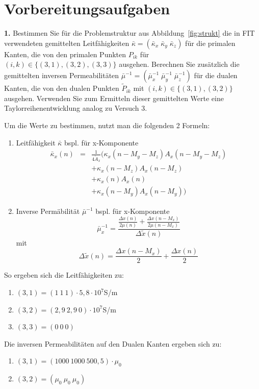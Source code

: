 \documentclass[Protokollheft.tex]{subfiles}
\begin{document}
\section{Vorbereitungsaufgaben}

\begin{framed}
	\noindent \textbf{1.} Bestimmen Sie für die Problemstruktur aus Abbildung~\ref{fig:strukt} die in FIT verwendeten
    gemittelten Leitfähigkeiten $\bar{\kappa}=(\bar{\kappa}_x\;\bar{\kappa}_y\;\bar{\kappa}_z)$ für die primalen Kanten, die von den primalen Punkten $P_{ik}$ für $(i,k)\in\{(3,1),(3,2),(3,3)\}$ ausgehen. Berechnen Sie zusätzlich die gemittelten inversen Permeabilitäten $\bar{\mu}^{-1}=(\bar{\mu}_x^{-1}\;\bar{\mu}_y^{-1}\;\bar{\mu}_z^{-1})$ für die dualen Kanten, die von den dualen Punkten $\widetilde{P}_{ik}$ mit $(i,k)\in\{(3,1),(3,2)\}$ ausgehen. Verwenden Sie zum Ermitteln dieser gemittelten Werte eine Taylorreihenentwicklung analog zu Versuch 3.\label{exer:averagedMaterials}
\end{framed}

Um die Werte zu bestimmen, nutzt man die folgenden 2 Formeln:
\begin{enumerate}
	\item Leitfähigkeit $\bar{\kappa}$
     bspl. für x-Komponente
     \begin{eqnarray*} \bar{\kappa}_x(n)& = &\frac{1}{4\tilde{A}_x}(\kappa_x(n-M_y-M_z)A_x(n-M_y-M_z)\\
     &  &+\kappa_x(n-M_z)A_x(n-M_z)\\
     &    &+\kappa_x(n)A_x(n)\\
     &   &+\kappa_x(n-M_y)A_x(n-M_y))
    \end{eqnarray*}

 \item Inverse Permäbilität $\bar{\mu}^{-1}$ bspl. für x-Komponente
$$\bar{\mu}_x^{-1}=\frac{\frac{\Delta x(n)}{2\mu(n)}+\frac{\Delta x(n-M_x)}{2\mu(n-M_x)}}{\Delta\tilde{x}(n)}$$ mit $$ \Delta\tilde{x}(n)=\frac{\Delta x(n-M_x)}{2}+\frac{\Delta x(n)}{2}$$
\end{enumerate}
\noindent
So ergeben sich die Leitfähigkeiten zu:
\begin{enumerate}
	\item $(3,1) = (1\ 1\ 1) \cdot 5,8\cdot 10^7$S/m
	\item $(3,2) = (2,9\ 2,9\ 0)\cdot 10^7$S/m
	\item $(3,3) = (0\ 0\ 0)$
\end{enumerate}
Die inversen Permeabilitäten auf den Dualen Kanten ergeben sich zu:
\begin{enumerate}
	\item $(3,1) = (1000\ 1000\ 500,5)\cdot \mu_0$
	\item $(3,2) = (\mu_0\ \mu_0\ \mu_0)$
\end{enumerate}
\end{document}
